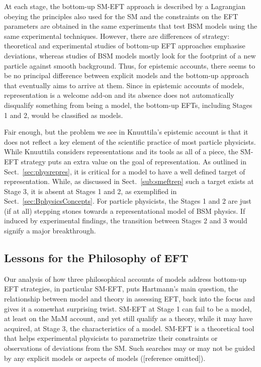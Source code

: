 At each stage, the bottom-up SM-EFT approach is described by a Lagrangian 
obeying the principles also used for the SM and the constraints on the EFT parameters are obtained in the same experiments that test BSM models using the same experimental techniques. 
However, there are differences of strategy: theoretical and experimental studies of bottom-up EFT approaches emphasise deviations, whereas studies of BSM models mostly look for the footprint of a new particle against smooth background.
Thus, for epistemic accounts, there seems to be no principal difference between explicit models and the bottom-up approach that eventually aims to arrive at them. 
Since in epistemic accounts of models, representation is a welcome add-on and its absence does not automatically disqualify something from being a model, the bottom-up EFTs, including Stages 1 and 2, would be classified as models.


Fair enough, but the problem we see in Knuuttila's epistemic account is that it does not reflect a key element of the scientific practice of most particle physicists. 
While Knuuttila considers representations and its tools as all of a piece, the SM-EFT strategy puts an extra value on the goal of representation. 
As outlined in Sect.~\ref{sec:physrepres}, it is critical for a model to have a well defined target of representation. 
While, as discussed in Sect.~\ref{sub:smeftrep} such a target exists at Stage 3, it is absent at Stages 1 and 2, as exemplified in Sect.~\ref{sec:BphysicsConcepts}. 
For particle physicists, the Stages 1 and 2 are just (if at all) stepping stones towards a representational model of BSM physics.
If induced by experimental findings, the transition between Stages 2 and 3 would signify a major breakthrough.

\subsection{Lessons for the Philosophy of EFT} \label{sub:EFT}

Our analysis of how three philosophical accounts of models address bottom-up EFT strategies, in particular SM-EFT, puts Hartmann's main question, the relationship between model and theory in assessing EFT, back into the focus and gives it a somewhat surprising twist.
SM-EFT at Stage 1 can fail to be a model, at least on the MaM account, and yet still qualify as a theory, while it may have acquired, at Stage 3, the characteristics of a model.
SM-EFT is a theoretical tool that helps experimental physicists to parametrize their constraints or observations of deviations from the SM. 
Such searches may or may not be guided by any explicit models or aspects of models ([reference omitted]).

